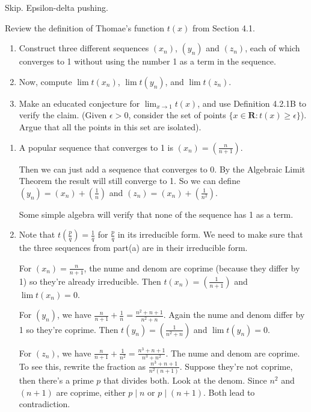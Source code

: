 \documentclass{oxmathproblems}
\begin{document}
\begin{questions}
\miquestion Skip. Epsilon-delta pushing.

\miquestion Review the definition of Thomae's function $t(x)$ from Section 4.1.
\begin{enumerate}[label=(\alph*)]
  \item Construct three different sequences $(x_{n})$, $(y_{n})$ and $(z_{n})$, each of which converges to 1 without using the number 1 as a term in the sequence.
  \item Now, compute $\lim t(x_{n})$, $\lim t(y_{n})$, and $\lim t(z_{n})$.
  \item Make an educated conjecture for $\lim_{x \to 1}t(x)$, and use Definition 4.2.1B to verify the claim. (Given $\epsilon > 0$, consider the set of points
  $\{x \in \textbf{R} : t(x) \geq \epsilon\}$). Argue that all the points in this set are isolated).
\end{enumerate}

\begin{solution}
  \begin{enumerate}[label=(\alph*)]
    \item A popular sequence that converges to 1 is $(x_{n}) = (\frac{n}{n+1})$.
    
    Then we can just add a sequence that converges to 0. By the Algebraic Limit Theorem
    the result will still converge to 1. So we can define $(y_{n}) = (x_{n}) + (\frac{1}{n})$ and $(z_{n}) = (x_{n}) + (\frac{1}{n^{2}})$.

    Some simple algebra will verify that none of the sequence has 1 as a term.

    \item Note that $t(\frac{p}{q}) = \frac{1}{q}$ for $\frac{p}{q}$ in its irreducible form. We need to make sure that the three sequences from
    part(a) are in their irreducible form.
    
    For $(x_{n}) = \frac{n}{n+1}$, the nume and denom are coprime (because they differ by 1) so they're already irreducible.
    Then $t(x_{n}) = (\frac{1}{n+1})$ and $\lim t(x_{n}) = 0$.

    For $(y_{n})$, we have $\frac{n}{n+1} + \frac{1}{n} = \frac{n^{2}+n+1}{n^{2}+n}$. Again the nume and denom differ by 1 so they're coprime. Then
    $t(y_{n}) = (\frac{1}{n^{2}+n})$ and $\lim t(y_{n}) = 0$.

    For $(z_{n})$, we have $\frac{n}{n+1} + \frac{1}{n^{2}} = \frac{n^3+n+1}{n^3+n^2}$. The nume and denom are coprime. To see this, rewrite the
    fraction as $\frac{n^3+n+1}{n^2(n+1)}$. Suppose they're not coprime, then there's a prime $p$ that divides both. Look at the denom. Since
    $n^2$ and $(n+1)$ are coprime, either $p \mid n$ or $p \mid (n+1)$. Both lead to contradiction.


\end{enumerate}
\end{solution}
\end{questions}
\end{document}
